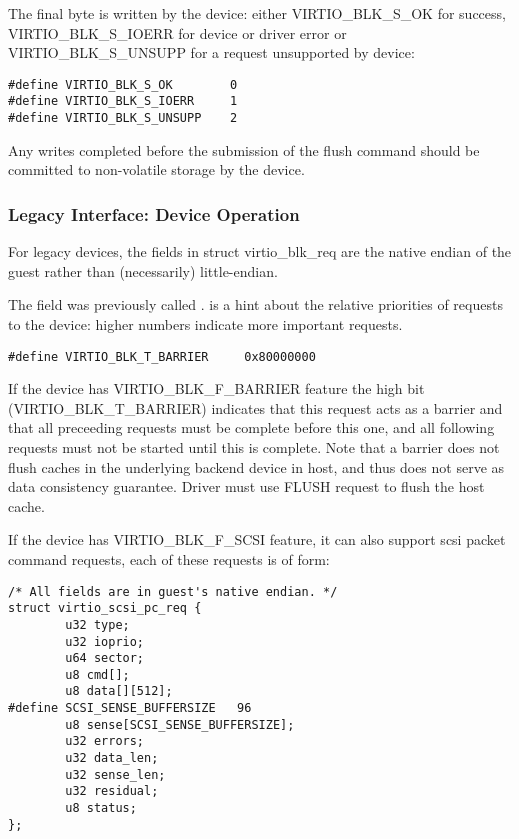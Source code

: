 The final  byte is written by the device: either
VIRTIO_BLK_S_OK for success, VIRTIO_BLK_S_IOERR for device or driver
error or VIRTIO_BLK_S_UNSUPP for a request unsupported by device:

\begin{lstlisting}
#define VIRTIO_BLK_S_OK        0
#define VIRTIO_BLK_S_IOERR     1
#define VIRTIO_BLK_S_UNSUPP    2
\end{lstlisting}

Any writes completed before the submission of the flush command should
be committed to non-volatile storage by the device.

\subsubsection{Legacy Interface: Device Operation}\label{sec:Device Types / Block Device / Device Operation / Legacy Interface: Device Operation}
For legacy devices, the fields in struct virtio_blk_req are the
native endian of the guest rather than (necessarily) little-endian.

The  field was previously called .  
is a hint about the relative priorities of requests to the device:
higher numbers indicate more important requests.

\begin{lstlisting}
#define VIRTIO_BLK_T_BARRIER     0x80000000
\end{lstlisting}

If the device has VIRTIO_BLK_F_BARRIER
feature the high bit (VIRTIO_BLK_T_BARRIER) indicates that this
request acts as a barrier and that all preceeding requests must be
complete before this one, and all following requests must not be
started until this is complete. Note that a barrier does not flush
caches in the underlying backend device in host, and thus does not
serve as data consistency guarantee. Driver must use FLUSH request to
flush the host cache.

If the device has VIRTIO_BLK_F_SCSI feature, it can also support
scsi packet command requests, each of these requests is of form:

\begin{lstlisting}
/* All fields are in guest's native endian. */
struct virtio_scsi_pc_req {
        u32 type;
        u32 ioprio;
        u64 sector;
        u8 cmd[];
        u8 data[][512];
#define SCSI_SENSE_BUFFERSIZE   96
        u8 sense[SCSI_SENSE_BUFFERSIZE];
        u32 errors;
        u32 data_len;
        u32 sense_len;
        u32 residual;
        u8 status;
};
\end{lstlisting}

